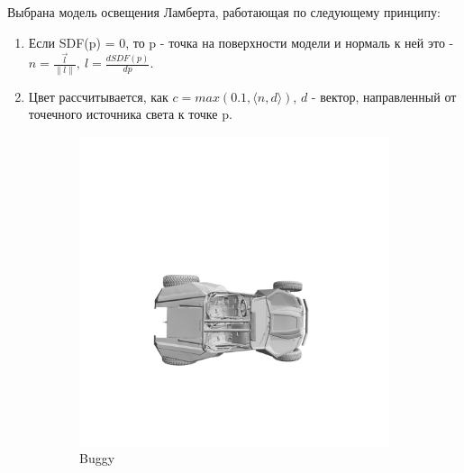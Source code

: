 \documentclass[a4paper,hidelinks,12pt]{article}
\begin{document}
\medskip

Выбрана модель освещения Ламберта, работающая по следующему принципу:
\begin{enumerate}[leftmargin=4em]
	\item Если SDF(p) = 0, то p - точка на поверхности модели и нормаль к ней это - $n = \frac{\vec{l}}{\|l\|}, \ l = \frac{dSDF(p)}{dp}$.
	\item Цвет рассчитывается, как $c = max(0.1, \langle n, d \rangle)$, $d$ - вектор, направленный от точечного источника света к точке p.
\end{enumerate}

\begin{figure}[ht]
	\centering
	\begin{subfigure}[b]{0.3\textwidth}
			\includegraphics[width=\textwidth]{buggy.png}
			\caption{Buggy}
			\label{fig:img1}
	\end{subfigure}
	\hfill
	\begin{subfigure}[b]{0.3\textwidth}

\end{subfigure}
\end{figure}
\end{document}
